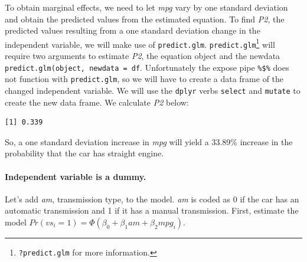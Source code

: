 \documentclass[]{book}
\newenvironment{Shaded}{\begin{snugshade}}{\end{snugshade}}
\newcommand{\CommentTok}[1]{\textcolor[rgb]{0.56,0.35,0.01}{\textit{#1}}}
\newcommand{\DataTypeTok}[1]{\textcolor[rgb]{0.13,0.29,0.53}{#1}}
\newcommand{\KeywordTok}[1]{\textcolor[rgb]{0.13,0.29,0.53}{\textbf{#1}}}
\newcommand{\NormalTok}[1]{#1}
\newcommand{\OperatorTok}[1]{\textcolor[rgb]{0.81,0.36,0.00}{\textbf{#1}}}
\newcommand{\StringTok}[1]{\textcolor[rgb]{0.31,0.60,0.02}{#1}}
\let\oldparagraph\paragraph
\renewcommand{\paragraph}[1]{\oldparagraph{#1}\mbox{}}
\let\rmarkdownfootnote\footnote%
\def\footnote{\protect\rmarkdownfootnote}
\begin{document}
To obtain marginal effects, we need to let \emph{mpg} vary by one standard deviation and obtain the predicted values from the estimated equation. To find \emph{P2}, the predicted values resulting from a one standard deviation change in the independent variable, we will make use of \texttt{predict.glm}. \texttt{predict.glm}\footnote{\texttt{?predict.glm} for more information.} will require two arguments to estimate \emph{P2}, the equation object and the newdata \texttt{predict.glm(object,\ newdata\ =\ df}. Unfortunately the expose pipe \texttt{\%\$\%} does not function with \texttt{predict.glm}, so we will have to create a data frame of the changed independent variable. We will use the \texttt{dplyr} verbs \texttt{select} and \texttt{mutate} to create the new data frame. We calculate \emph{P2} below:

\begin{Shaded}
\end{Shaded}

\begin{verbatim}
[1] 0.339
\end{verbatim}

So, a one standard deviation increase in \emph{mpg} will yield a 33.89\% increase in the probability that the car has straight engine.

\hypertarget{independent-variable-is-a-dummy.}{%
\paragraph{Independent variable is a dummy.}\label{independent-variable-is-a-dummy.}}

Let's add \emph{am}, transmission type, to the model. \emph{am} is coded as 0 if the car has an automatic transmission and 1 if it has a manual transmission. First, estimate the model \(Pr(vs_i=1)=\Phi(\beta_0+\beta_1am+\beta_2mpg_i)\).
\end{document}
